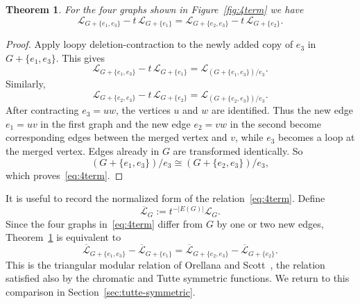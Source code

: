 \documentclass[11pt]{article}
\theoremstyle{plain}
\newtheorem{theorem}{Theorem}[section]
\theoremstyle{definition}
\renewcommand{\mathcal}{\mathscr}
\newcommand{\LL}{\mathcal{L}}    %
\numberwithin{equation}{section}
\begin{document}
\begin{theorem}\label{thm:4term}
For the four graphs shown in Figure~\ref{fig:4term} we have
\begin{equation}\label{eq:4term}
\LL_{G+\{e_1,e_3\}}-t\,\LL_{G+\{e_1\}}
=
\LL_{G+\{e_2,e_3\}}-t\,\LL_{G+\{e_2\}}.
\end{equation}
\end{theorem}

\begin{proof}
Apply loopy deletion-contraction to the newly added copy of $e_3$ in
$G+\{e_1,e_3\}$.  This gives
\[
\LL_{G+\{e_1,e_3\}}-t\,\LL_{G+\{e_1\}}
=
\LL_{(G+\{e_1,e_3\})/e_3}.
\]
Similarly,
\[
\LL_{G+\{e_2,e_3\}}-t\,\LL_{G+\{e_2\}}
=
\LL_{(G+\{e_2,e_3\})/e_3}.
\]
After contracting $e_3=uw$, the vertices $u$ and $w$ are identified.
Thus the new edge $e_1=uv$ in the first graph and the new edge
$e_2=vw$ in the second become corresponding edges between the
merged vertex and $v$, while $e_3$ becomes a loop at the merged vertex.
Edges already in $G$ are transformed identically.  So
\[
   (G+\{e_1,e_3\})/e_3
   \cong
   (G+\{e_2,e_3\})/e_3,
\]
which proves~\eqref{eq:4term}.
\end{proof}

It is useful to record the normalized form of the relation~\eqref{eq:4term}.  Define
\[
   \overline{\LL}_G:=t^{-|E(G)|}\LL_G.
\]
Since the four graphs in~\eqref{eq:4term} differ from $G$ by one or two
new edges, Theorem~\ref{thm:4term} is equivalent to
\begin{equation}\label{eq:normalized-4term}
\overline{\LL}_{G+\{e_1,e_3\}}
-\overline{\LL}_{G+\{e_1\}}
=
\overline{\LL}_{G+\{e_2,e_3\}}
-\overline{\LL}_{G+\{e_2\}}.
\end{equation}
This is the triangular modular relation of Orellana and Scott~\cite{OS},
the relation satisfied also by the chromatic and Tutte symmetric functions.  We return to this comparison in
Section~\ref{sec:tutte-symmetric}.
\end{document}
